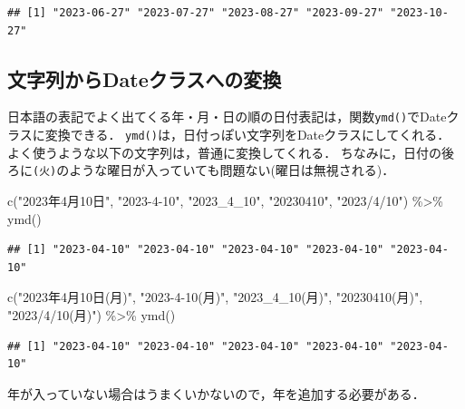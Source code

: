 \documentclass[
]{article}
\newenvironment{Shaded}{\begin{snugshade}}{\end{snugshade}}
\newcommand{\FunctionTok}[1]{\textcolor[rgb]{0.00,0.00,0.00}{#1}}
\newcommand{\NormalTok}[1]{#1}
\newcommand{\SpecialCharTok}[1]{\textcolor[rgb]{0.00,0.00,0.00}{#1}}
\newcommand{\StringTok}[1]{\textcolor[rgb]{0.31,0.60,0.02}{#1}}
\begin{document}
\begin{verbatim}
## [1] "2023-06-27" "2023-07-27" "2023-08-27" "2023-09-27" "2023-10-27"
\end{verbatim}

\hypertarget{ux6587ux5b57ux5217ux304bux3089dateux30afux30e9ux30b9ux3078ux306eux5909ux63db}{%
\subsection{文字列からDateクラスへの変換}\label{ux6587ux5b57ux5217ux304bux3089dateux30afux30e9ux30b9ux3078ux306eux5909ux63db}}

日本語の表記でよく出てくる年・月・日の順の日付表記は，関数\texttt{ymd()}でDateクラスに変換できる．
\texttt{ymd()}は，日付っぽい文字列をDateクラスにしてくれる．
よく使うような以下の文字列は，普通に変換してくれる．
ちなみに，日付の後ろに\texttt{(火)}のような曜日が入っていても問題ない(曜日は無視される)．

\begin{Shaded}
\begin{Highlighting}[]
\FunctionTok{c}\NormalTok{(}\StringTok{"2023年4月10日"}\NormalTok{, }\StringTok{"2023{-}4{-}10"}\NormalTok{, }\StringTok{"2023\_4\_10"}\NormalTok{, }\StringTok{"20230410"}\NormalTok{, }\StringTok{"2023/4/10"}\NormalTok{) }\SpecialCharTok{\%\textgreater{}\%}
  \FunctionTok{ymd}\NormalTok{()}
\end{Highlighting}
\end{Shaded}

\begin{verbatim}
## [1] "2023-04-10" "2023-04-10" "2023-04-10" "2023-04-10" "2023-04-10"
\end{verbatim}

\begin{Shaded}
\begin{Highlighting}[]
\FunctionTok{c}\NormalTok{(}\StringTok{"2023年4月10日(月)"}\NormalTok{, }\StringTok{"2023{-}4{-}10(月)"}\NormalTok{, }\StringTok{"2023\_4\_10(月)"}\NormalTok{, }\StringTok{"20230410(月)"}\NormalTok{, }\StringTok{"2023/4/10(月)"}\NormalTok{) }\SpecialCharTok{\%\textgreater{}\%}
  \FunctionTok{ymd}\NormalTok{()}
\end{Highlighting}
\end{Shaded}

\begin{verbatim}
## [1] "2023-04-10" "2023-04-10" "2023-04-10" "2023-04-10" "2023-04-10"
\end{verbatim}

年が入っていない場合はうまくいかないので，年を追加する必要がある．
\end{document}
